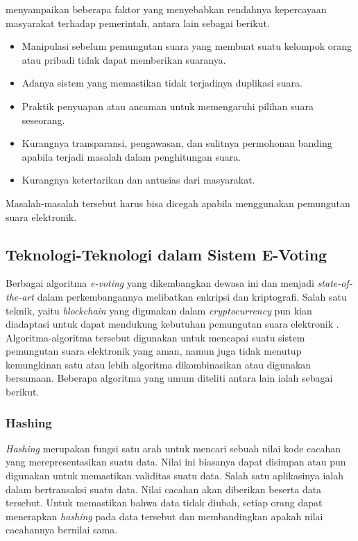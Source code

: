 \documentclass[12pt, a4paper, final]{article}
\begin{document}
\cite{8651451} menyampaikan beberapa faktor yang menyebabkan rendahnya kepercayaan masyarakat terhadap pemerintah, antara lain sebagai berikut.

\begin{itemize}
    \setlength\itemsep{-0.5em}
    \item Manipulasi sebelum pemungutan suara yang membuat suatu kelompok orang atau pribadi tidak dapat memberikan suaranya.
    \item Adanya sistem yang memastikan tidak terjadinya duplikasi suara.
    \item Praktik penyuapan atau ancaman untuk memengaruhi pilihan suara seseorang.
    \item Kurangnya transparansi, pengawasan, dan sulitnya permohonan banding apabila terjadi masalah dalam penghitungan suara.
    \item Kurangnya ketertarikan dan antusias dari masyarakat.
\end{itemize}

Masalah-masalah tersebut harus bisa dicegah apabila menggunakan pemungutan suara elektronik.

\subsection{Teknologi-Teknologi dalam Sistem E-Voting}

Berbagai algoritma \textit{e-voting} yang dikembangkan dewasa ini dan menjadi \textit{state-of-the-art} dalam perkembangannya melibatkan enkripsi dan kriptografi. Salah satu teknik, yaitu \textit{blockchain} yang digunakan dalam \textit{cryptocurrency} pun kian diadaptasi untuk dapat mendukung kebutuhan pemungutan suara elektronik \citep{8651451}. Algoritma-algoritma tersebut digunakan untuk mencapai suatu sistem pemungutan suara elektronik yang aman, namun juga tidak menutup kemungkinan satu atau lebih algoritma dikombinasikan atau digunakan bersamaan. Beberapa algoritma yang umum diteliti antara lain ialah sebagai berikut.

\subsubsection{Hashing}

\textit{Hashing} merupakan fungsi satu arah untuk mencari sebuah nilai kode cacahan yang merepresentasikan suatu data. Nilai ini biasanya dapat disimpan atau pun digunakan untuk memastikan validitas suatu data. Salah satu aplikasinya ialah dalam bertransaksi suatu data. Nilai cacahan akan diberikan beserta data tersebut. Untuk memastikan bahwa data tidak diubah, setiap orang dapat menerapkan \textit{hashing} pada data tersebut dan membandingkan apakah nilai cacahannya bernilai sama.
\end{document}
